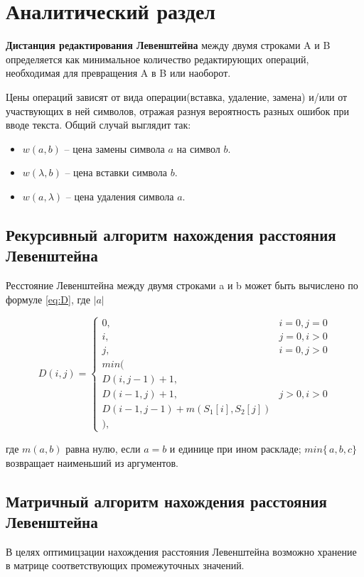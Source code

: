 \chapter{Аналитический раздел}
\label{cha:analysis}
%
%

\textbf{Дистанция редактирования Левенштейна} между двумя строками A и B определяется как минимальное количество редактирующих операций, необходимая для превращения A в B или наоборот. 

Цены операций зависят от вида операции(вставка, удаление, замена) и/или от участвующих в ней символов, отражая разнуя вероятность разных ошибок при вводе текста. Общий случай выглядит так: 
\begin{itemize}
\item $w(a,b)$ -- цена замены символа $a$ на символ $b$.
\item $w(\lambda,b)$ -- цена вставки символа $b$.
\item $w(a, \lambda)$ -- цена удаления символа $a$.
\end{itemize}

\section{Рекурсивный алгоритм нахождения расстояния Левенштейна}

Ресстояние Левенштейна между двумя строками a и b может быть вычислено по формуле \ref{eq:D}, где $|a|$

\begin{equation}
\label{eq:D}
	D(i,j) = \left\{ \begin{array}{ll}
	0, & \textrm{$i = 0, j = 0$}\\
	i, & \textrm{$j = 0, i > 0$}\\
	j, & \textrm{$i = 0, j > 0$}\\
	min(\\
	D(i,j-1)+1,\\
	D(i-1, j) +1, &\textrm{$j>0, i>0$}\\
	D(i-1, j-1) + m(S_{1}[i], S_{2}[j])\\
	),
	\end{array} \right.
\end{equation}

\noindent
где $m(a,b)$ равна нулю, если $a=b$ и единице при ином раскладе; $min\{\,a,b,c\}$ возвращает наименьший из аргументов.


\section{Матричный алгоритм нахождения расстояния Левенштейна}
В целях оптимицзации нахождения расстояния Левенштейна возможно хранение в матрице соответствующих промежуточных значений.

